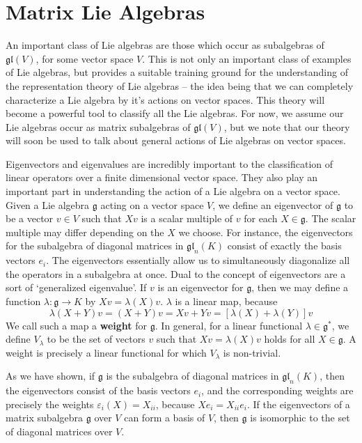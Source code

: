 \chapter{Matrix Lie Algebras}

An important class of Lie algebras are those which occur as subalgebras of $\mathfrak{gl}(V)$, for some vector space $V$. This is not only an important class of examples of Lie algebras, but provides a suitable training ground for the understanding of the representation theory of Lie algebras -- the idea being that we can completely characterize a Lie algebra by it's actions on vector spaces. This theory will become a powerful tool to classify all the Lie algebras. For now, we assume our Lie algebras occur as matrix subalgebras of $\mathfrak{gl}(V)$, but we note that our theory will soon be used to talk about general actions of Lie algebras on vector spaces.

Eigenvectors and eigenvalues are incredibly important to the classification of linear operators over a finite dimensional vector space. They also play an important part in understanding the action of a Lie algebra on a vector space. Given a Lie algebra $\mathfrak{g}$ acting on a vector space $V$, we define an eigenvector of $\mathfrak{g}$ to be a vector $v \in V$ such that $Xv$ is a scalar multiple of $v$ for each $X \in \mathfrak{g}$. The scalar multiple may differ depending on the $X$ we choose. For instance, the eigenvectors for the subalgebra of diagonal matrices in $\mathfrak{gl}_n(K)$ consist of exactly the basis vectors $e_i$. The eigenvectors essentially allow us to simultaneously diagonalize all the operators in a subalgebra at once. Dual to the concept of eigenvectors are a sort of `generalized eigenvalue'. If $v$ is an eigenvector for $\mathfrak{g}$, then we may define a function $\lambda: \mathfrak{g} \to K$ by $Xv = \lambda(X) v$. $\lambda$ is a linear map, because
%
\[ \lambda(X + Y)v = (X + Y)v = Xv + Yv = [\lambda(X) + \lambda(Y)]v \]
%
We call such a map a {\bf weight} for $\mathfrak{g}$. In general, for a linear functional $\lambda \in \mathfrak{g}^*$, we define $V_\lambda$ to be the set of vectors $v$ such that $Xv = \lambda(X)v$ holds for all $X \in \mathfrak{g}$. A weight is precisely a linear functional for which $V_\lambda$ is non-trivial.

\begin{example}
    As we have shown, if $\mathfrak{g}$ is the subalgebra of diagonal matrices in $\mathfrak{gl}_n(K)$, then the eigenvectors consist of the basis vectors $e_i$, and the corresponding weights are precisely the weights $\varepsilon_i(X) = X_{ii}$, because $Xe_i = X_{ii} e_i$. If the eigenvectors of a matrix subalgebra $\mathfrak{g}$ over $V$ can form a basis of $V$, then $\mathfrak{g}$ is isomorphic to the set of diagonal matrices over $V$.
\end{example}

